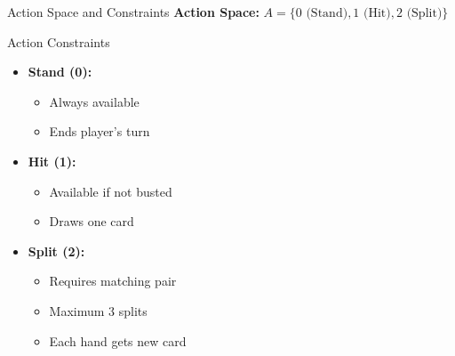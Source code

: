 \documentclass{beamer}
\begin{document}
\begin{frame}{Action Space and Constraints}
    \textbf{Action Space:} \(A = \{0 \text{ (Stand)}, 1 \text{ (Hit)}, 2 \text{ (Split)}\}\)
    
    \begin{block}{Action Constraints}
        \begin{itemize}
            \item \textbf{Stand (0):}
                \begin{itemize}
                    \item Always available
                    \item Ends player's turn
                \end{itemize}
            \item \textbf{Hit (1):}
                \begin{itemize}
                    \item Available if not busted
                    \item Draws one card
                \end{itemize}
            \item \textbf{Split (2):}
                \begin{itemize}
                    \item Requires matching pair
                    \item Maximum 3 splits
                    \item Each hand gets new card
                \end{itemize}
        \end{itemize}
    \end{block}
\end{frame}
\end{document}
